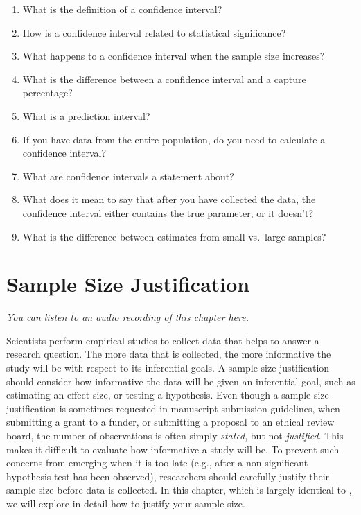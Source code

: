 \documentclass[
  oneside]{krantz}
\begin{document}
\begin{enumerate}
\def\labelenumi{\arabic{enumi}.}
\item
  What is the definition of a confidence interval?
\item
  How is a confidence interval related to statistical significance?
\item
  What happens to a confidence interval when the sample size increases?
\item
  What is the difference between a confidence interval and a capture percentage?
\item
  What is a prediction interval?
\item
  If you have data from the entire population, do you need to calculate a confidence interval?
\item
  What are confidence intervals a statement about?
\item
  What does it mean to say that after you have collected the data, the confidence interval either contains the true parameter, or it doesn't?
\item
  What is the difference between estimates from small vs.~large samples?
\end{enumerate}

\hypertarget{power}{%
\chapter{Sample Size Justification}\label{power}}

\emph{You can listen to an audio recording of this chapter \href{https://soundcloud.com/lakens/sample-size-justification-by-daniel-lakens}{here}.}

Scientists perform empirical studies to collect data that helps to answer a research question. The more data that is collected, the more informative the study will be with respect to its inferential goals. A sample size justification should consider how informative the data will be given an inferential goal, such as estimating an effect size, or testing a hypothesis. Even though a sample size justification is sometimes requested in manuscript submission guidelines, when submitting a grant to a funder, or submitting a proposal to an ethical review board, the number of observations is often simply \emph{stated}, but not \emph{justified}. This makes it difficult to evaluate how informative a study will be. To prevent such concerns from emerging when it is too late (e.g., after a non-significant hypothesis test has been observed), researchers should carefully justify their sample size before data is collected. In this chapter, which is largely identical to \citet{lakens_sample_2022}, we will explore in detail how to justify your sample size.
\end{document}
